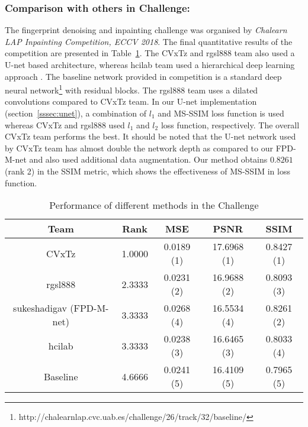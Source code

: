 \documentclass{llncs}
\begin{document}
\subsubsection{Comparison with others in Challenge:}
\label{sssec:challenge}
The fingerprint denoising and inpainting challenge was organised by \textit{Chalearn LAP Inpainting Competition, ECCV 2018}. The final quantitative results of the competition are presented in Table~\ref{table:chal}. The CVxTz and rgsl888 team also used a U-net \cite{ronneberger2015u} based architecture, whereas hcilab team used a hierarchical deep learning approach \cite{salakhutdinov2013learning}. The baseline network provided in competition is a standard deep neural network\footnote{http://chalearnlap.cvc.uab.es/challenge/26/track/32/baseline/} with residual blocks. The rgsl888 team uses a dilated convolutions compared to CVxTz team. In our U-net implementation (section~\ref{sssec:unet}), a combination of $l_1$ and MS-SSIM loss function is used whereas CVxTz and rgsl888 used $l_1$ and $l_2$ loss function, respectively. The overall CVxTz team performs the best. It should be noted that the U-net network used by CVxTz team has almost double the network depth as compared to our FPD-M-net and also used additional data augmentation. Our method obtains $0.8261$ (rank 2) in the SSIM metric, which shows the effectiveness of MS-SSIM in loss function.

\vspace{-0.3cm}
\begin{table}[h!]
\centering
\addtolength{\tabcolsep}{8pt}
\begin{tabular}{ c | c | c | c | c }
    \hline \hline
    Team          & Rank    & MSE        & PSNR        & SSIM   \\ \hline \hline
    CVxTz        & 1.0000  & 0.0189 (1) & 17.6968 (1) & 0.8427 (1) \\
    rgsl888      & 2.3333  & 0.0231 (2) & 16.9688 (2) & 0.8093 (3) \\
    sukeshadigav (FPD-M-net) & 3.3333  & 0.0268 (4) & 16.5534 (4) & 0.8261 (2) \\
    hcilab       & 3.3333  & 0.0238 (3) & 16.6465 (3) & 0.8033 (4) \\
    Baseline 	 & 4.6666  & 0.0241 (5)	& 16.4109 (5) & 0.7965 (5) \\
    \hline\hline
\end{tabular}
\caption{Performance of different methods in the Challenge}
\label{table:chal}
\end{table}
\end{document}
